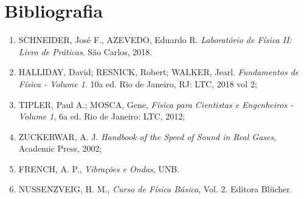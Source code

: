 \newpage
\section{Bibliografia}

\begin{enumerate}
  \item SCHNEIDER, José F., AZEVEDO, Eduardo R. \textit{Laboratório de Física II: Livro de Práticas}. São Carlos, 2018.
  \item HALLIDAY, David; RESNICK, Robert; WALKER, Jearl. \textit{Fundamentos de Física - Volume 1}. 10a ed. Rio de Janeiro, RJ: LTC, 2018 vol 2;
  \item TIPLER, Paul A.; MOSCA, Gene, \textit{Física para Cientistas e Engenheiros - Volume 1}, 6a ed. Rio de Janeiro: LTC, 2012;
  \item ZUCKERWAR, A. J. \textit{Handbook of the Speed of Sound in Real Gases}, Academic Press, 2002;
  \item FRENCH, A. P., \textit{Vibrações e Ondas}, UNB.
  \item NUSSENZVEIG, H. M., \textit{Curso de Física Básica}, Vol. 2. Editora Blücher.
\end{enumerate}
